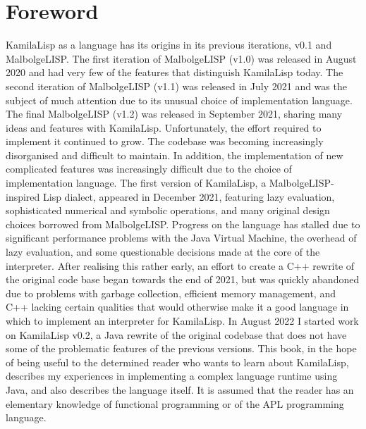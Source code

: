 
\chapter*{Foreword}
\par KamilaLisp as a language has its origins in its previous iterations, v0.1 and MalbolgeLISP. The first iteration of MalbolgeLISP (v1.0) was released in August 2020 and had very few of the features that distinguish KamilaLisp today. The second iteration of MalbolgeLISP (v1.1) was released in July 2021 and was the subject of much attention due to its unusual choice of implementation language. The final MalbolgeLISP (v1.2) was released in September 2021, sharing many ideas and features with KamilaLisp. Unfortunately, the effort required to implement it continued to grow. The codebase was becoming increasingly disorganised and difficult to maintain. In addition, the implementation of new complicated features was increasingly difficult due to the choice of implementation language. The first version of KamilaLisp, a MalbolgeLISP-inspired Lisp dialect, appeared in December 2021, featuring lazy evaluation, sophisticated numerical and symbolic operations, and many original design choices borrowed from MalbolgeLISP. Progress on the language has stalled due to significant performance problems with the Java Virtual Machine, the overhead of lazy evaluation, and some questionable decisions made at the core of the interpreter. After realising this rather early, an effort to create a C++ rewrite of the original code base began towards the end of 2021, but was quickly abandoned due to problems with garbage collection, efficient memory management, and C++ lacking certain qualities that would otherwise make it a good language in which to implement an interpreter for KamilaLisp. In August 2022 I started work on KamilaLisp v0.2, a Java rewrite of the original codebase that does not have some of the problematic features of the previous versions. This book, in the hope of being useful to the determined reader who wants to learn about KamilaLisp, describes my experiences in implementing a complex language runtime using Java, and also describes the language itself. It is assumed that the reader has an elementary knowledge of functional programming or of the APL programming language.
